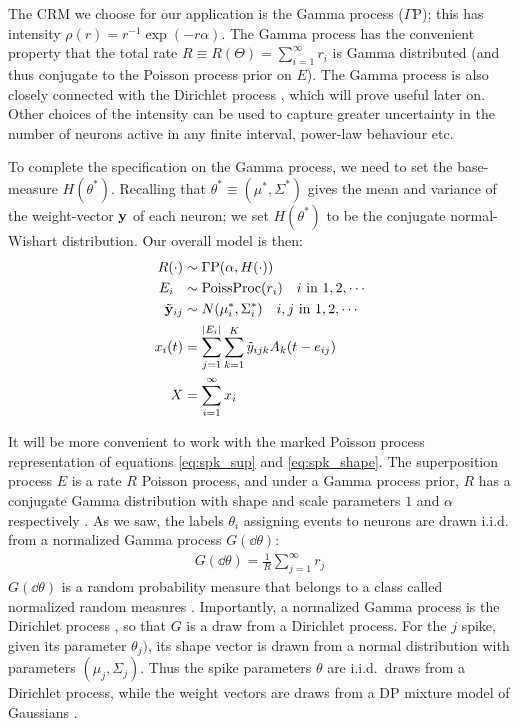 The CRM we choose for our application is the Gamma process ($\Gamma$P); this has \Levy intensity $\rho(r) = r^{-1}\exp(-r\alpha)$. 
The Gamma process has the convenient property that the 
total rate $R \equiv R(\Theta) = \sum_{i=1}^{\infty} r_i$ is Gamma distributed (and thus conjugate to the Poisson process prior on $E$).
The Gamma process is also closely connected with the Dirichlet process \citep{Ferguson73}, which will prove useful
later on.
Other choices of the \Levy intensity can be used to capture greater uncertainty in the number of neurons active in any finite interval, power-law 
behaviour etc.

To complete the specification on the Gamma process, we need to set the base-measure $H(\theta^*)$.
Recalling that $\theta^* \equiv (\mu^*, \Sigma^*)$ gives the mean and variance of the weight-vector $\mathbf{y}$ of each neuron; we set $H(\theta^*)$ 
to be the conjugate normal-Wishart distribution. Our overall model is then:
\begin{align}
  R(\cdot) & \sim \Gamma \text{P}(\alpha, H(\cdot)) \\ %
  E_i\ \  &\sim \text{PoissProc}(r_i) \quad i \text{ in } 1,2,\cdots \\
  \tilde{\by}_{ij} & \sim N(\mu^*_i, \Sigma^*_i) \quad i,j \text{ in } 1,2,\cdots \\
  x_i(t) &= \sum_{j = 1}^{|E_i|}  \sum_{k = 1}^{K} \tilde{y}_{ijk} A_k(t - e_{ij}) \\
  X   &= \sum_{i=1}^{\infty} x_i
\end{align}


It will be more convenient to work with the marked Poisson process representation of equations \ref{eq:spk_sup} and \ref{eq:spk_shape}. 
The superposition process $E$ is a rate $R$ Poisson process,
and under a Gamma process prior, $R$ has a conjugate Gamma distribution with shape and scale parameters $1$ and $\alpha$ respectively \citep{Ferguson73}.
As we saw, the labels $\theta_i$ assigning events to neurons are drawn i.i.d. from a normalized Gamma process $G(\dd \theta)$:
\begin{align}
 G(\dd \theta) = \frac{1}{R} \sum_{j=1}^{\infty} r_j
\end{align}
$G(\dd \theta)$ is a random probability measure that belongs to a class called normalized random measures \citep{JamesLP09}. Importantly, a 
normalized Gamma process is the Dirichlet process \citep{Ferguson73}, so that $G$ is a draw from a Dirichlet process. For the $j$ spike, given its 
parameter $\theta_j)$, its shape vector is drawn from a normal distribution
with parameters $(\mu_{j}, \Sigma_{j})$. Thus the spike parameters $\theta$ are i.i.d.\ draws from a Dirichlet process, while the weight vectors are
draws from a DP mixture model of Gaussians \citep{Lo1984}.

